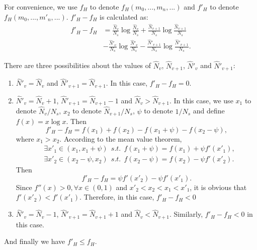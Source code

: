 \documentclass[10pt,journal,compsoc]{IEEEtran}
\begin{document}
\newpage
\begin{IEEEproof}
For convenience, we use $f_H$ to denote $f_H(m_0,...,m_n,...)$ and $f'_H$ to denote $f_H(m_0,...,m'_n,...)$. $f'_H - f_H$ is calculated as:
\begin{equation}
\begin{split}
f'_H - f_H &= \frac{\hat{N}_v}{N_s}\log\frac{\hat{N}_v}{N_s} + \frac{\hat{N}_{v+1}}{N_s}\log\frac{\hat{N}_{v+1}}{N_s} \\ &- \frac{\hat{N}'_v}{N_s}\log\frac{\hat{N}'_v}{N_s} - \frac{\hat{N}'_{v+1}}{N_s}\log\frac{\hat{N}'_{v+1}}{N_s}.
\end{split}
\end{equation}

There are three possibilities about the values of $\hat{N}_v$, $\hat{N}_{v+1}$, $\hat{N}'_v$ and $\hat{N}'_{v+1}$:
\begin{enumerate}
    \item $\hat{N}'_v = \hat{N}_v$ and $\hat{N}'_{v+1} = \hat{N}_{v+1}$. In this case, $f'_H - f_H = 0$.
    \item $\hat{N}'_v = \hat{N}_v + 1$, $\hat{N}'_{v+1} = \hat{N}_{v+1} -1$ and $\hat{N}_v>\hat{N}_{v+1}$. In this case, we use $x_1$ to denote $\hat{N}_{v}/N_s$, $x_2$ to denote $\hat{N}_{v+1}/N_s$, $\psi$ to denote $1/N_s$ and define $f(x) = x\log x$. Then 
\begin{equation}
    f'_H - f_H = f(x_1)+f(x_2)-f(x_1+\psi)-f(x_2-\psi),
\end{equation}
where $x_1>x_2$. According to the mean value theorem,
\begin{equation}
    \begin{split}
        &\exists x'_1\in (x_1, x_1+\psi) \ \ s.t. \ \ f(x_1+\psi) = f(x_1)+\psi f'(x'_1), \\
        &\exists x'_2\in (x_2-\psi, x_2) \ \ s.t. \ \ f(x_2-\psi) = f(x_2)-\psi f'(x'_2).
    \end{split}
\end{equation}
Then
\begin{equation}
    f'_H - f_H = \psi f'(x'_2) - \psi f'(x'_1).
\end{equation}
Since $f''(x)>0,\forall x \in (0,1)$ and $x'_2<x_2<x_1<x'_1$, it is obvious that $f'(x'_2)<f'(x'_1)$. Therefore, in this case, $f'_H - f_H < 0$
    \item $\hat{N}'_v = \hat{N}_v - 1$, $\hat{N}'_{v+1} = \hat{N}_{v+1} +1$ and $\hat{N}_v<\hat{N}_{v+1}$. Similarly, $f'_H - f_H < 0$ in this case.
\end{enumerate}

And finally we have $f'_H \leq f_H$.
\end{IEEEproof}





\end{document}

